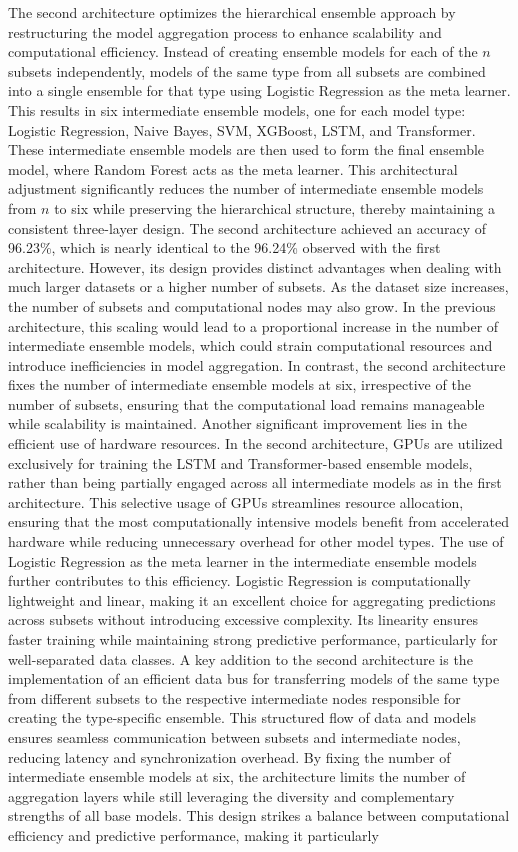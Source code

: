 \noindent
The second architecture optimizes the hierarchical ensemble approach by restructuring the model aggregation process to enhance scalability and computational efficiency. Instead of creating ensemble models for each of the $n$ subsets independently, models of the same type from all subsets are combined into a single ensemble for that type using Logistic Regression as the meta learner. This results in six intermediate ensemble models, one for each model type: Logistic Regression, Naive Bayes, SVM, XGBoost, LSTM, and Transformer. These intermediate ensemble models are then used to form the final ensemble model, where Random Forest acts as the meta learner. This architectural adjustment significantly reduces the number of intermediate ensemble models from $n$ to six while preserving the hierarchical structure, thereby maintaining a consistent three-layer design. The second architecture achieved an accuracy of 96.23\%, which is nearly identical to the 96.24\% observed with the first architecture. However, its design provides distinct advantages when dealing with much larger datasets or a higher number of subsets. As the dataset size increases, the number of subsets and computational nodes may also grow. In the previous architecture, this scaling would lead to a proportional increase in the number of intermediate ensemble models, which could strain computational resources and introduce inefficiencies in model aggregation. In contrast, the second architecture fixes the number of intermediate ensemble models at six, irrespective of the number of subsets, ensuring that the computational load remains manageable while scalability is maintained. Another significant improvement lies in the efficient use of hardware resources. In the second architecture, GPUs are utilized exclusively for training the LSTM and Transformer-based ensemble models, rather than being partially engaged across all intermediate models as in the first architecture. This selective usage of GPUs streamlines resource allocation, ensuring that the most computationally intensive models benefit from accelerated hardware while reducing unnecessary overhead for other model types. The use of Logistic Regression as the meta learner in the intermediate ensemble models further contributes to this efficiency. Logistic Regression is computationally lightweight and linear, making it an excellent choice for aggregating predictions across subsets without introducing excessive complexity. Its linearity ensures faster training while maintaining strong predictive performance, particularly for well-separated data classes. A key addition to the second architecture is the implementation of an efficient data bus for transferring models of the same type from different subsets to the respective intermediate nodes responsible for creating the type-specific ensemble. This structured flow of data and models ensures seamless communication between subsets and intermediate nodes, reducing latency and synchronization overhead. By fixing the number of intermediate ensemble models at six, the architecture limits the number of aggregation layers while still leveraging the diversity and complementary strengths of all base models. This design strikes a balance between computational efficiency and predictive performance, making it particularly 